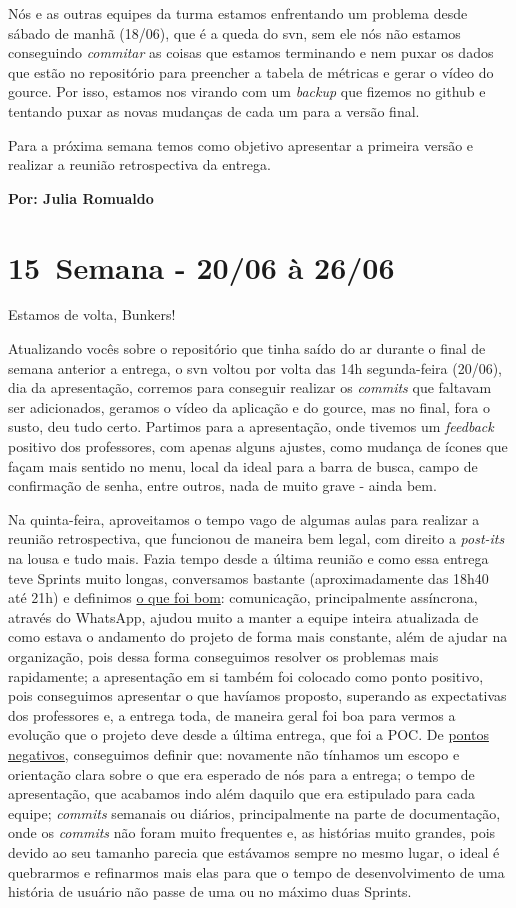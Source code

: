 Nós e as outras equipes da turma estamos enfrentando um problema desde sábado de manhã (18/06), que é a queda do \gls{svn}, sem ele nós não estamos conseguindo \textit{commitar} as coisas que estamos terminando e nem puxar os dados que estão no repositório para preencher a tabela de métricas e gerar o vídeo do \gls{gource}. Por isso, estamos nos virando com um \textit{backup} que fizemos no \gls{github} e tentando puxar as novas mudanças de cada um para a versão final.

Para a próxima semana temos como objetivo apresentar a primeira versão e realizar a reunião retrospectiva da entrega. 

\textbf{Por: Julia Romualdo}

\section{15\textordfeminine \, Semana - 20/06 à 26/06}
Estamos de volta, Bunkers!

Atualizando vocês sobre o repositório que tinha saído do ar durante o final de semana anterior a entrega, o \acs{svn} voltou por volta das 14h segunda-feira (20/06), dia da apresentação, corremos para conseguir realizar os \textit{commits} que faltavam ser adicionados, geramos o vídeo da aplicação e do \gls{gource}, mas no final, fora o susto, deu tudo certo. Partimos para a apresentação, onde tivemos um \textit{feedback} positivo dos professores, com apenas alguns ajustes, como mudança de ícones que façam mais sentido no menu, local da ideal para a barra de busca, campo de confirmação de senha, entre outros, nada de muito grave - ainda bem. 

Na quinta-feira, aproveitamos o tempo vago de algumas aulas para realizar a reunião retrospectiva, que funcionou de maneira bem legal, com direito a \textit{post-its} na lousa e tudo mais. Fazia tempo desde a última reunião e como essa entrega teve \glspl{Sprint} muito longas, conversamos bastante (aproximadamente das 18h40 até 21h) e definimos \underline{o que foi bom}: comunicação, principalmente assíncrona, através do \gls{WhatsApp}, ajudou muito a manter a equipe inteira atualizada de como estava o andamento do projeto de forma mais constante, além de ajudar na organização, pois dessa forma conseguimos resolver os problemas mais rapidamente; a apresentação em si também foi colocado como ponto positivo, pois conseguimos apresentar o que havíamos proposto, superando as expectativas dos professores e, a entrega toda, de maneira geral foi boa para vermos a evolução que o projeto deve desde a última entrega, que foi a \acs{POC}. De \underline{pontos negativos}, conseguimos definir que: novamente não tínhamos um escopo e orientação clara sobre o que era esperado de nós para a entrega; o tempo de apresentação, que acabamos indo além daquilo que era estipulado para cada equipe; \textit{commits} semanais ou diários, principalmente na parte de documentação, onde os \textit{commits} não foram muito frequentes e, as histórias muito grandes, pois devido ao seu tamanho parecia que estávamos sempre no mesmo lugar, o ideal é quebrarmos e refinarmos mais elas para que o tempo de desenvolvimento de uma história de usuário não passe de uma ou no máximo duas \glspl{Sprint}.

